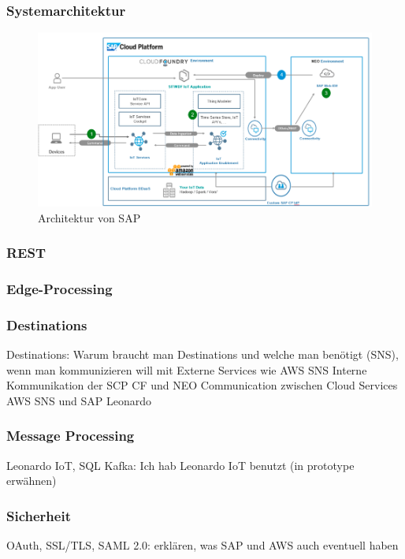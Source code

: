 \subsubsection{Systemarchitektur}
\begin{figure}[H]
    \centering
    \includegraphics[width=1.0\linewidth]{pictures/sap_architecture}
    \caption[Referenzarchitektur von SAP]{Architektur von SAP \citep{Ganz2019}}
    \label{fig:filename_without_extension}
\end{figure}


\subsubsection{REST}

\subsubsection{Edge-Processing}

\subsubsection{Destinations}
Destinations: Warum braucht man Destinations und welche man benötigt (SNS),  wenn man kommunizieren will mit
Externe Services wie AWS SNS
Interne Kommunikation der SCP CF und NEO
Communication zwischen Cloud Services AWS SNS und SAP Leonardo

\subsubsection{Message Processing}
Leonardo IoT, SQL Kafka: Ich hab Leonardo IoT benutzt (in prototype erwähnen)

\subsubsection{Sicherheit}
OAuth, SSL/TLS, SAML 2.0: erklären, was SAP und AWS auch eventuell haben

